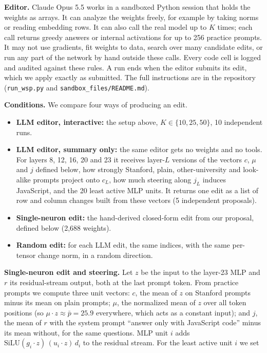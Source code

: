 \documentclass{article}
\begin{document}
\textbf{Editor.} Claude Opus 5.5 works in a sandboxed Python session that holds the weights as arrays. It can analyze the weights freely, for example by taking norms or reading embedding rows. It can also call the real model up to $K$ times; each call returns greedy answers or internal activations for up to 256 practice prompts. It may not use gradients, fit weights to data, search over many candidate edits, or run any part of the network by hand outside these calls. Every code cell is logged and audited against these rules. A run ends when the editor submits its edit, which we apply exactly as submitted. The full instructions are in the repository (\texttt{run\_wsp.py} and \texttt{sandbox\_files/README.md}).

\textbf{Conditions.} We compare four ways of producing an edit.
\begin{itemize}
\item \textbf{LLM editor, interactive:} the setup above, $K \in \{10, 25, 50\}$, 10 independent runs.
\item \textbf{LLM editor, summary only:} the same editor gets no weights and no tools. For layers 8, 12, 16, 20 and 23 it receives layer-$L$ versions of the vectors $c$, $\mu$ and $j$ defined below, how strongly Stanford, plain, other-university and look-alike prompts project onto $c_L$, how much steering along $j_L$ induces JavaScript, and the 20 least active MLP units. It returns one edit as a list of row and column changes built from these vectors (5 independent proposals).
\item \textbf{Single-neuron edit:} the hand-derived closed-form edit from our proposal, defined below (2{,}688 weights).
\item \textbf{Random edit:} for each LLM edit, the same indices, with the same per-tensor change norm, in a random direction.
\end{itemize}
\textbf{Single-neuron edit and steering.} Let $z$ be the input to the layer-23 MLP and $r$ its residual-stream output, both at the last prompt token. From practice prompts we compute three unit vectors: $c$, the mean of $z$ on Stanford prompts minus its mean on plain prompts; $\mu$, the normalized mean of $z$ over all token positions (so $\mu\cdot z \approx \bar p = 25.9$ everywhere, which acts as a constant input); and $j$, the mean of $r$ with the system prompt ``answer only with JavaScript code'' minus its mean without, for the same questions. MLP unit $i$ adds $\mathrm{SiLU}(g_i\cdot z)\,(u_i\cdot z)\,d_i$ to the residual stream. For the least active unit $i$ we set
\end{document}
